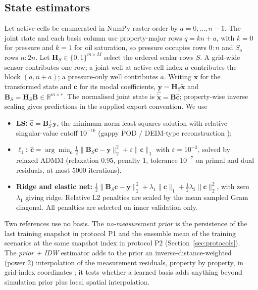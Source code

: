 \subsection{State estimators}
\label{sec:estimators}
Let active cells be enumerated in NumPy raster order by $a=0,\dots,n-1$. The joint state and each basis column use property-major rows $q=kn+a$, with $k=0$ for pressure and $k=1$ for oil saturation, so pressure occupies rows $0{:}n$ and $S_o$ rows $n{:}2n$. Let $\mathbf{H}_S\in\{0,1\}^{m\times M}$ select the ordered scalar rows $S$. A grid-wide sensor contributes one row; a joint well at active-cell index $a$ contributes the block $(a,n+a)$; a pressure-only well contributes $a$. Writing $\tilde{\mathbf{x}}$ for the transformed state and $\mathbf c$ for its modal coefficients, $\mathbf{y}=\mathbf{H}_S\tilde{\mathbf{x}}$ and $\mathbf{B}_S=\mathbf{H}_S\mathbf{B}\in\mathbb{R}^{m\times r}$. The normalised joint state is $\hat{\tilde{\mathbf{x}}}=\mathbf{B}\hat{\mathbf{c}}$; property-wise inverse scaling gives predictions in the supplied export convention. We use
\begin{itemize}
\item \textbf{LS:} $\hat{\mathbf{c}}=\mathbf{B}_S^{+}\mathbf{y}$, the minimum-norm least-squares solution with relative singular-value cutoff $10^{-10}$ (gappy POD / DEIM-type reconstruction \cite{everson1995,willcox2006,chaturantabut2010});
\item \textbf{$\ell_1$:} $\hat{\mathbf{c}}=\arg\min_{\mathbf{c}}\tfrac12\|\mathbf{B}_S\mathbf{c}-\mathbf{y}\|_2^2+\varepsilon\|\mathbf{c}\|_1$ with $\varepsilon=10^{-2}$, solved by relaxed ADMM \cite{zhong2024tbmd,donoho2006,boyd2011} (relaxation 0.95, penalty 1, tolerance $10^{-7}$ on primal and dual residuals, at most 5000 iterations).
\item \textbf{Ridge and elastic net:} $\tfrac12\|\mathbf{B}_S\mathbf{c}-\mathbf{y}\|_2^2+\lambda_1\|\mathbf{c}\|_1+\tfrac12\lambda_2\|\mathbf{c}\|_2^2$, with zero $\lambda_1$ giving ridge. Relative L2 penalties are scaled by the mean sampled Gram diagonal. All penalties are selected on inner validation only.
\end{itemize}
Two references use no basis. The \emph{no-measurement prior} is the persistence of the last training snapshot in protocol P1 and the ensemble mean of the training scenarios at the same snapshot index in protocol P2 (Section~\ref{sec:protocols}). The \emph{prior + IDW} estimator adds to the prior an inverse-distance-weighted (power 2) interpolation of the measurement residuals, property by property, in grid-index coordinates \cite{shepard1968}; it tests whether a learned basis adds anything beyond simulation prior plus local spatial interpolation.
